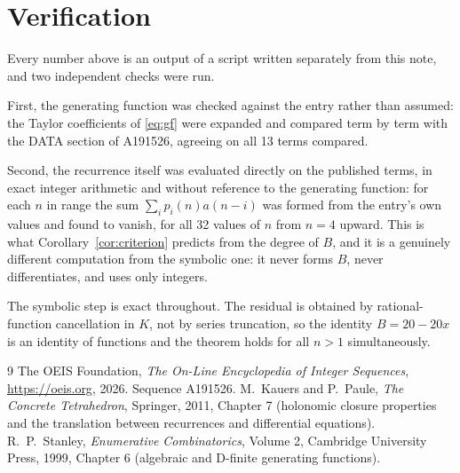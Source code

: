 \documentclass[11pt,a4paper]{article}
\theoremstyle{plain}
\theoremstyle{definition}
\begin{document}
\section{Verification}

Every number above is an output of a script written separately from this note, and two
independent checks were run.

First, the generating function was checked against the entry rather than assumed: the
Taylor coefficients of \eqref{eq:gf} were expanded and compared term by term with the DATA
section of A191526, agreeing on all 13 terms compared.

Second, the recurrence itself was evaluated directly on the published terms, in exact
integer arithmetic and without reference to the generating function: for each $n$ in range
the sum $\sum_{i}p_{i}(n)a(n-i)$ was formed from the entry's own values and found to
vanish, for all 32 values of $n$ from $n=4$ upward. This is what
Corollary~\ref{cor:criterion} predicts from the degree of $B$, and it is a genuinely
different computation from the symbolic one: it never forms $B$, never differentiates, and
uses only integers.

The symbolic step is exact throughout. The residual is obtained by rational-function
cancellation in $K$, not by series truncation, so the identity $B=20 - 20 x$ is an
identity of functions and the theorem holds for all $n>1$ simultaneously.

\begin{thebibliography}{9}
 The OEIS Foundation, \emph{The On-Line Encyclopedia of Integer Sequences},
\url{https://oeis.org}, 2026. Sequence A191526.
 M.~Kauers and P.~Paule, \emph{The Concrete Tetrahedron}, Springer, 2011,
Chapter 7 (holonomic closure properties and the translation between recurrences and
differential equations).
 R.~P.~Stanley, \emph{Enumerative Combinatorics}, Volume 2, Cambridge
University Press, 1999, Chapter 6 (algebraic and D-finite generating functions).
\end{thebibliography}
\end{document}

